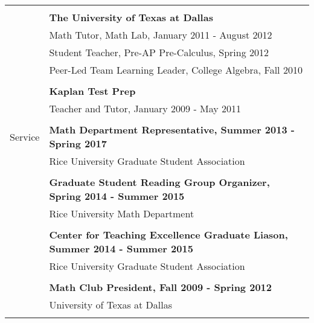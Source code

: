 \documentclass[letterpaper,11pt,oneside]{article}
\begin{document}
         \begin{tabular}{@{} l l}
       \Large{}   & \\
     &\textbf{The University of Texas at Dallas} \\
     & Math Tutor, Math Lab, January 2011 - August 2012 \\
     & Student Teacher, Pre-AP Pre-Calculus, Spring 2012 \\
          & Peer-Led Team Learning Leader, College Algebra, Fall 2010 \\
     & \\
     & \textbf{Kaplan Test Prep} \\
     & Teacher and Tutor, January 2009 - May 2011 \\
     & \\
     
	
       \Large{Service}   & \textbf{Math Department Representative, Summer 2013 - Spring 2017} \\
     & Rice University Graduate Student Association\\
     & \\

& \textbf{Graduate Student Reading Group Organizer, Spring 2014 - Summer 2015} \\
     & Rice University Math Department\\
     & \\

& \textbf{Center for Teaching Excellence Graduate Liason, Summer 2014 - Summer 2015} \\
     & Rice University Graduate Student Association\\
     & \\

 & \textbf{Math Club President, Fall 2009 - Spring 2012} \\
     & University of Texas at Dallas\\
     & \\

 
\end{tabular}
\end{document}
